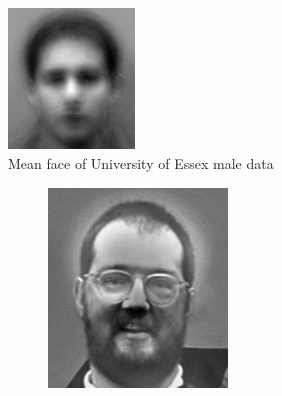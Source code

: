 \begin{figure}
\includegraphics[width=0.3\textwidth]{meanFace.png}
\caption{Mean face of University of Essex male data}
\label{facialRecognition:meanFace}
\end{figure}

\begin{figure}
\begin{subfigure}[b]{0.3\textwidth}
\includegraphics[width=\textwidth]{differenceFace0.png}
\end{subfigure}
\begin{subfigure}[b]{0.3\textwidth}

\end{subfigure}
\end{figure}

